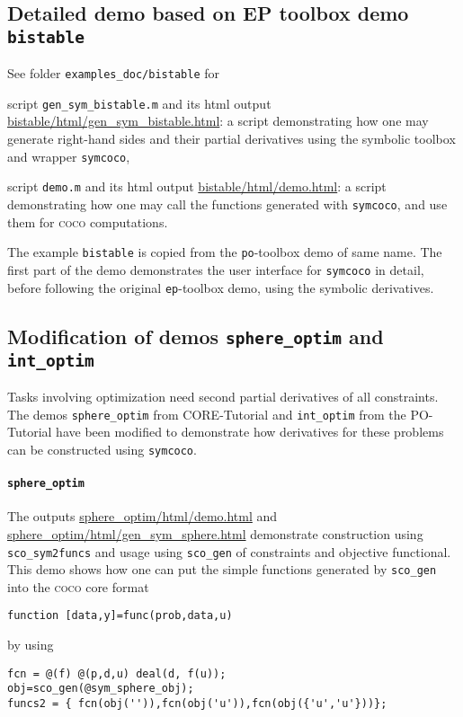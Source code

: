 \documentclass[11pt]{scrartcl}
\newcommand{\blist}[1]{\mbox{\lstinline!#1!}}
\begin{document}
\subsection{Detailed demo based on EP toolbox demo \texttt{bistable}}
\label{sec:bistable}
See folder \texttt{examples\_doc/bistable} for
\begin{compactitem}
\item script \texttt{gen\_sym\_bistable.m} and its html output
  \url{bistable/html/gen_sym_bistable.html}: a script demonstrating
  how one may generate right-hand sides and their partial derivatives
  using the symbolic toolbox and wrapper \texttt{symcoco},
\item script \texttt{demo.m} and its html output
  \url{bistable/html/demo.html}: a script demonstrating how one may
  call the functions generated with \texttt{symcoco}, and use them for
  \textsc{coco} computations.
\end{compactitem}
The example \texttt{bistable} is copied from the \texttt{po}-toolbox
demo of same name. The first part of the demo demonstrates the user
interface for \blist{symcoco} in detail, before following the original
\texttt{ep}-toolbox demo, using the symbolic derivatives.

\subsection{Modification of demos \texttt{sphere\_optim} and \texttt{int\_optim}}
\label{sec:optim}
Tasks involving optimization need second partial derivatives of all
constraints. The demos \texttt{sphere\_optim} from CORE-Tutorial and
\texttt{int\_optim} from the PO-Tutorial have been modified to
demonstrate how derivatives for these problems can be constructed
using \texttt{symcoco}.

\paragraph{\texttt{sphere\_optim}} The outputs
\url{sphere_optim/html/demo.html} and
\url{sphere_optim/html/gen_sym_sphere.html} demonstrate construction
using \blist{sco_sym2funcs} and usage using \blist{sco_gen} of
constraints and objective functional. This demo shows how one can put
the simple functions generated by \blist{sco_gen} into the
\textsc{coco} core format
\begin{lstlisting}
function [data,y]=func(prob,data,u)
\end{lstlisting}
by using
\begin{lstlisting}
fcn = @(f) @(p,d,u) deal(d, f(u));
obj=sco_gen(@sym_sphere_obj);
funcs2 = { fcn(obj('')),fcn(obj('u')),fcn(obj({'u','u'}))};
\end{lstlisting}
\end{document}
